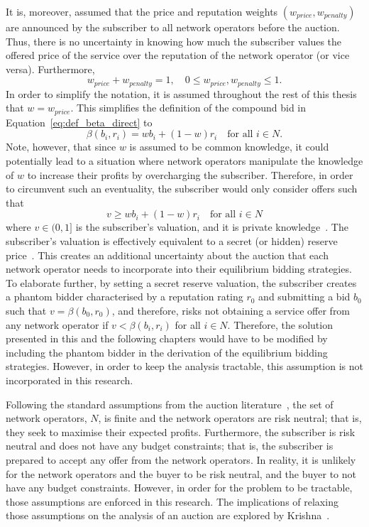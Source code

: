 It is, moreover, assumed that the price and reputation weights $(w_{price}, w_{penalty})$ are announced by the subscriber to all network operators before the auction. Thus, there is no uncertainty in knowing how much the subscriber values the offered price of the service over the reputation of the network operator (or vice versa). Furthermore,
\begin{equation}
	w_{price} + w_{penalty} = 1,\quad 0\le w_{price},w_{penalty} \le 1.
\end{equation}
In order to simplify the notation, it is assumed throughout the rest of this thesis that $w=w_{price}$. This simplifies the definition of the compound bid in Equation~\eqref{eq:def_beta_direct} to
\begin{equation}
  \beta(b_i, r_i) = wb_i + (1-w)r_i\quad\text{for all } i\in N.
\end{equation}
Note, however, that since $w$ is assumed to be common knowledge, it could potentially lead to a situation where network operators manipulate the knowledge of $w$ to increase their profits by overcharging the subscriber. Therefore, in order to circumvent such an eventuality, the subscriber would only consider offers such that
\begin{equation}
	\label{eq:subscribers_valuation_direct}
	v\geq wb_i + (1-w)r_i \quad\text{for all } i\in N
\end{equation}
where $v\in (0,1]$ is the subscriber's valuation, and it is private knowledge~\cite{DMLeBodic00}. The subscriber's valuation is effectively equivalent to a secret (or hidden) reserve price~\cite{Vincent1995575,LiPerrigne1999,BajariHortacsu2003}. This creates an additional uncertainty about the auction that each network operator needs to incorporate into their equilibrium bidding strategies. To elaborate further, by setting a secret reserve valuation, the subscriber creates a phantom bidder characterised by a reputation rating $r_0$ and submitting a bid $b_0$ such that $v=\beta(b_0,r_0)$, and therefore, risks not obtaining a service offer from any network operator if $v < \beta(b_i,r_i)$ for all $i\in N$. Therefore, the solution presented in this and the following chapters would have to be modified by including the phantom bidder in the derivation of the equilibrium bidding strategies. However, in order to keep the analysis tractable, this assumption is not incorporated in this research.
	
Following the standard assumptions from the auction literature~\cite{Krishna10}, the set of network operators, $N$, is finite and the network operators are risk neutral; that is, they seek to maximise their expected profits. Furthermore, the subscriber is risk neutral and does not have any budget constraints; that is, the subscriber is prepared to accept any offer from the network operators. In reality, it is unlikely for the network operators and the buyer to be risk neutral, and the buyer to not have any budget constraints. However, in order for the problem to be tractable, those assumptions are enforced in this research. The implications of relaxing those assumptions on the analysis of an auction are explored by Krishna~\cite{Krishna10}.

